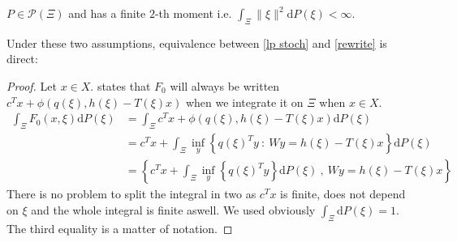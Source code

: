 \documentclass{amsart}
\begin{document}
\begin{assumption}
\label{h2} $P\in\mathcal{P}\left(\Xi\right)$ and has a finite $2$-th moment i.e. $\int_\Xi \lVert \xi\rVert^2\text{d}P\left(\xi\right) < \infty$.
\end{assumption}
\noindent Under these two assumptions, equivalence between \ref{lp stoch} and \ref{rewrite} is direct:
\begin{proof}
    Let $x\in X$.  states that $F_0$ will always be written $c^Tx + \phi\left(q\left(\xi\right), h\left(\xi\right) -T\left(\xi\right)x\right)$ when we integrate it on $\Xi$ when $x\in X$.
    \begin{align*}
        \int_\Xi F_0\left(x,\xi\right)\text{d}P\left(\xi\right)&=\int_\Xi c^Tx + \phi\left(q\left(\xi\right), h\left(\xi\right) -T\left(\xi\right)x\right)\text{d}P\left(\xi\right) \\
        &= c^Tx + \int_\Xi \inf_y\left\{q\left(\xi\right)^Ty\: :\: Wy=h\left(\xi\right) -T\left(\xi\right)x\right\}\text{d}P\left(\xi\right) \\
        &= \left\{c^Tx + \int_\Xi \inf_y\left\{q\left(\xi\right)^Ty\right\}\text{d}P\left(\xi\right)\:,\: Wy=h\left(\xi\right) -T\left(\xi\right)x\right\}
    \end{align*}
    There is no problem to split the integral in two as $c^Tx$ is finite, does not depend on $\xi$ and the whole integral is finite aswell. We  used obviously $\int_\Xi\text{d}P\left(\xi\right)=1$. The third equality is a matter of notation. 
\end{proof}
\end{document}
